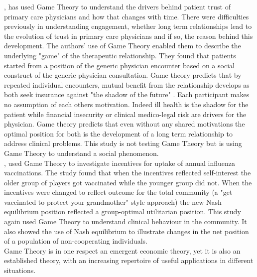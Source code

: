 \documentclass[11pt,a4paper]{article}
\begin{document}
\citet{tarrant2010continuity}, has used Game Theory to understand the drivers behind patient trust of primary care physicians and how that changes with time. There were difficulties previously in understanding engagement, whether long term relationships lead to the evolution of trust in primary care physicians and if so, the reason behind this development. The authors' use of Game Theory enabled them to describe the underlying "game" of the therapeutic relationship. They found that patients started from a position of the generic physician encounter based on a social construct of the generic physician consultation. Game theory predicts that by repeated individual encounters, mutual benefit from the relationship develops as both seek insurance against "the shadow of the future" \citep{tarrant2010continuity}. Each participant makes no assumption of each others motivation. Indeed ill health is the shadow for the patient while financial insecurity or clinical medico-legal risk  are drivers for the physician. Game theory predicts that even without any shared motivations the optimal position for both is the development of a long term relationship to address clinical problems.  This study is not testing Game Theory but is using Game Theory to understand a social phenomenon. \\

\citet{chapman2012using}, used Game Theory to investigate incentives for uptake of annual influenza vaccinations.  The study found that when the incentives reflected self-interest the older group of players got vaccinated while the younger group did not. When the incentives were changed to reflect outcome for the total community (a "get vaccinated to protect your grandmother" style approach) the new Nash equilibrium position reflected a group-optimal utilitarian position. This study again used Game Theory to understand clinical behaviour in the community. It also showed the use of Nash equilibrium to illustrate changes in the net position of a population of non-cooperating individuals. \\

Game Theory is in one respect an emergent economic theory, yet it is also an established theory, with an increasing repertoire of useful applications in different situations. \\
\end{document}
